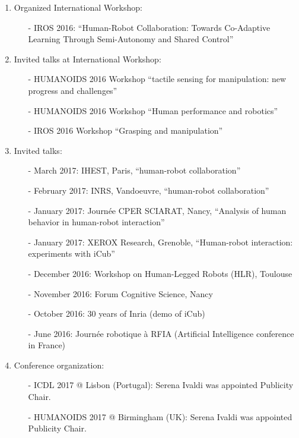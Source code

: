 \begin{itemize}
\begin{enumerate}
 \item Organized International Workshop:
  \begin{itemize}
\item[-] IROS 2016: ``Human-Robot Collaboration: Towards Co-Adaptive Learning Through Semi-Autonomy and Shared Control''
 \end{itemize}

\item Invited talks at International Workshop:

  \begin{itemize}
\item[-] HUMANOIDS 2016 Workshop ``tactile sensing for manipulation: new progress and challenges''
\item[-] HUMANOIDS 2016 Workshop ``Human performance and robotics''
\item[-] IROS 2016 Workshop ``Grasping and manipulation''
  \end{itemize}

\item Invited talks:

  \begin{itemize}
\item[-] March 2017: IHEST, Paris, ``human-robot collaboration''
\item[-] February 2017: INRS, Vandoeuvre, ``human-robot collaboration''
\item[-] January 2017: Journée CPER SCIARAT, Nancy, ``Analysis of human behavior in human-robot interaction''
\item[-] January 2017: XEROX Research, Grenoble, ``Human-robot interaction: experiments with iCub''
\item[-] December 2016: Workshop on Human-Legged Robots (HLR), Toulouse
\item[-] November 2016: Forum Cognitive Science, Nancy
\item[-] October 2016: 30 years of Inria (demo of iCub)
\item[-] June 2016: Journée robotique à RFIA (Artificial Intelligence conference in France)
  \end{itemize}

\item Conference organization:

  \begin{itemize}
\item[-] ICDL 2017 @ Lisbon (Portugal): Serena Ivaldi was appointed Publicity Chair.
\item[-] HUMANOIDS 2017 @ Birmingham (UK): Serena Ivaldi was appointed  Publicity Chair.
  \end{itemize}


\end{enumerate}
\end{itemize}
